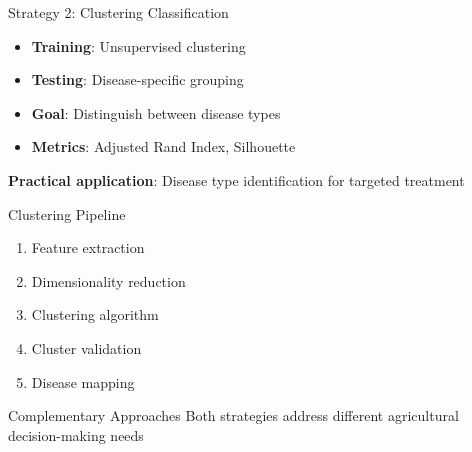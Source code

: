 \documentclass[aspectratio=43]{beamer}
\begin{document}
\begin{frame}
\begin{columns}
        \begin{column}{0.5\textwidth}
            \begin{block}{Strategy 2: Clustering Classification}
                \begin{itemize}
                    \item \textbf{Training}: Unsupervised clustering
                    \item \textbf{Testing}: Disease-specific grouping
                    \item \textbf{Goal}: Distinguish between disease types
                    \item \textbf{Metrics}: Adjusted Rand Index, Silhouette
                \end{itemize}
                
                \vspace{0.3cm}
                \textbf{Practical application}: Disease type identification for targeted treatment
            \end{block}
            
            \begin{alertblock}{Clustering Pipeline}
                \begin{enumerate}
                    \item Feature extraction
                    \item Dimensionality reduction
                    \item Clustering algorithm
                    \item Cluster validation
                    \item Disease mapping
                \end{enumerate}
            \end{alertblock}
            
            \begin{exampleblock}{Complementary Approaches}
                Both strategies address different agricultural decision-making needs
            \end{exampleblock}
        \end{column}
    \end{columns}
\end{frame}
\end{document}
